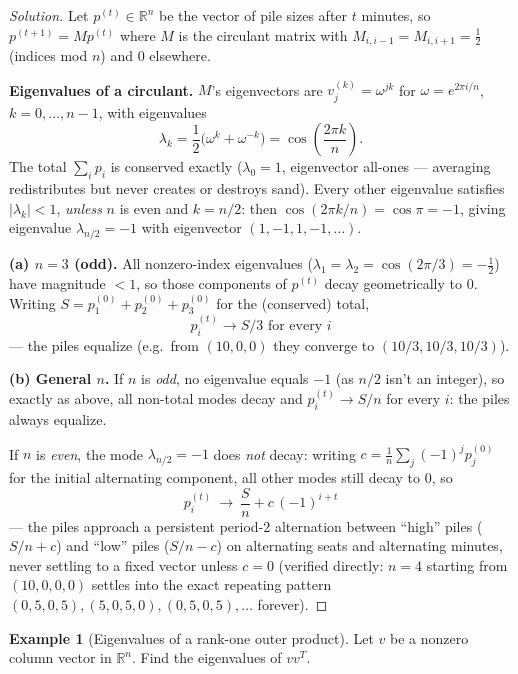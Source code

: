 \documentclass[11pt]{article}
\theoremstyle{definition}
\newtheorem{example}{Example}[section]
\newcommand{\R}{\mathbb{R}}
\begin{document}
\begin{proof}[Solution]
Let $p^{(t)}\in\R^n$ be the vector of pile sizes after $t$ minutes, so $p^{(t+1)}=Mp^{(t)}$ where $M$ is the circulant matrix with $M_{i,i-1}=M_{i,i+1}=\tfrac12$ (indices mod $n$) and $0$ elsewhere.

\textbf{Eigenvalues of a circulant.} $M$'s eigenvectors are $v^{(k)}_j=\omega^{jk}$ for $\omega=e^{2\pi i/n}$, $k=0,\dots,n-1$, with eigenvalues
\[
\lambda_k=\frac12\big(\omega^{k}+\omega^{-k}\big)=\cos\!\left(\frac{2\pi k}n\right).
\]
The total $\sum_ip_i$ is conserved exactly ($\lambda_0=1$, eigenvector all-ones — averaging redistributes but never creates or destroys sand). Every other eigenvalue satisfies $|\lambda_k|<1$, \emph{unless} $n$ is even and $k=n/2$: then $\cos(2\pi k/n)=\cos\pi=-1$, giving eigenvalue $\lambda_{n/2}=-1$ with eigenvector $(1,-1,1,-1,\dots)$.

\textbf{(a) $n=3$ (odd).} All nonzero-index eigenvalues ($\lambda_1=\lambda_2=\cos(2\pi/3)=-\tfrac12$) have magnitude $<1$, so those components of $p^{(t)}$ decay geometrically to $0$. Writing $S=p_1^{(0)}+p_2^{(0)}+p_3^{(0)}$ for the (conserved) total,
\[
\boxed{p_i^{(t)}\to S/3 \text{ for every } i}
\]
— the piles equalize (e.g.\ from $(10,0,0)$ they converge to $(10/3,10/3,10/3)$).

\textbf{(b) General $n$.} If $n$ is \emph{odd}, no eigenvalue equals $-1$ (as $n/2$ isn't an integer), so exactly as above, all non-total modes decay and $p_i^{(t)}\to S/n$ for every $i$: the piles always equalize.

If $n$ is \emph{even}, the mode $\lambda_{n/2}=-1$ does \emph{not} decay: writing $c=\tfrac1n\sum_j(-1)^jp_j^{(0)}$ for the initial alternating component, all other modes still decay to $0$, so
\[
\boxed{p_i^{(t)}\ \longrightarrow\ \frac Sn+c\,(-1)^{i+t}}
\]
— the piles approach a persistent period-$2$ alternation between ``high'' piles ($S/n+c$) and ``low'' piles ($S/n-c$) on alternating seats and alternating minutes, never settling to a fixed vector unless $c=0$ (verified directly: $n=4$ starting from $(10,0,0,0)$ settles into the exact repeating pattern $(0,5,0,5),(5,0,5,0),(0,5,0,5),\dots$ forever).
\end{proof}

\begin{example}[Eigenvalues of a rank-one outer product]
Let $v$ be a nonzero column vector in $\R^n$. Find the eigenvalues of $vv^T$.
\end{example}
\end{document}
